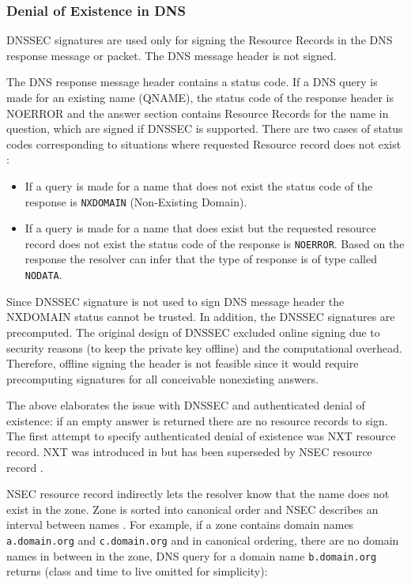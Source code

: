\subsubsection{Denial of Existence in DNS}

DNSSEC signatures are used only for signing the Resource Records in the DNS response message or packet. The DNS message header is not signed. \citep{RFC_7129}  

The DNS response message header contains a status code. If a DNS query is made for an existing name (QNAME), the status code of the response header is NOERROR and the answer section contains Resource Records for the name in question, which are signed if DNSSEC is supported. 
There are two cases of status codes corresponding to situations where requested Resource record does not exist \cite{RFC_7129}:

\begin{itemize}
 \item If a query is made for a name that does not exist the status code of the response is \texttt{NXDOMAIN} (Non-Existing Domain).  
 \item If a query is made for a name that does exist but the requested resource record does not exist the status code of the response is \texttt{NOERROR}. Based on the response the resolver can infer that the type of response is of type called \texttt{NODATA}.
\end{itemize}

Since DNSSEC signature is not used to sign DNS message header the NXDOMAIN status cannot be trusted. In addition, the DNSSEC signatures are precomputed. The original design of DNSSEC excluded online signing due to security reasons (to keep the private key offline) and the computational overhead. Therefore, offline signing the header is not feasible since it would require precomputing signatures for all conceivable nonexisting answers. \citep{RFC_7129}

The above elaborates the issue with DNSSEC and authenticated denial of existence: if an empty answer is returned there are no resource records to sign. The first attempt to specify authenticated denial of existence was NXT resource record. NXT was introduced in \cite{RFC_2065} but has been superseded by NSEC resource record \cite{RFC3845}.

NSEC resource record indirectly lets the resolver know that the name does not exist in the zone. Zone is sorted into canonical order and NSEC describes an interval between names \cite{RFC4034}. For example, if a zone contains domain names \texttt{a.domain.org} and \texttt{c.domain.org} and in canonical ordering, there are no domain names in between in the zone, DNS query for a domain name \texttt{b.domain.org} returns (class and time to live omitted for simplicity):

